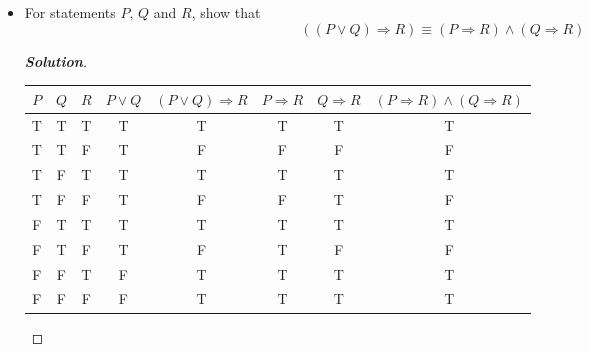 \documentclass[11pt]{article}
\newenvironment{problem}[2][Problem\!]{\begin{trivlist}
\item[\hskip \labelsep {\bfseries #1}\hskip \labelsep {\bfseries #2.}]}{\end{trivlist}}
\newenvironment{solution}{\begin{proof}[\textbf{\textit{Solution}}]}{\end{proof}}
\begin{document}
\begin{problem}{2.3}\hfill
\begin{itemize}[itemsep=3em]
\item[(a)] For statements $P,\, Q$ and $R$, show that \[((P \lor Q) \Rightarrow R) \equiv (P \Rightarrow R) \land (Q \Rightarrow R)\]
\begin{solution}
\begin{center}
\begin{tabular}{|c|c|c|c|c|c|c|c|}
\hline
$P$ & $Q$ & $R$ & $P \lor Q$ & $(P \lor Q) \Rightarrow R$ & $P \Rightarrow R$ & $Q \Rightarrow R$ & $(P \Rightarrow R) \land (Q \Rightarrow R)$ \\
\hline
T & T & T & T & T & T & T & T \\
T & T & F & T & F & F & F & F \\
T & F & T & T & T & T & T & T \\
T & F & F & T & F & F & T & F \\
F & T & T & T & T & T & T & T \\
F & T & F & T & F & T & F & F \\
F & F & T & F & T & T & T & T \\
F & F & F & F & T & T & T & T \\
\hline
\end{tabular}
\end{center}
\end{solution}


\end{itemize}
\end{problem}
\end{document}
